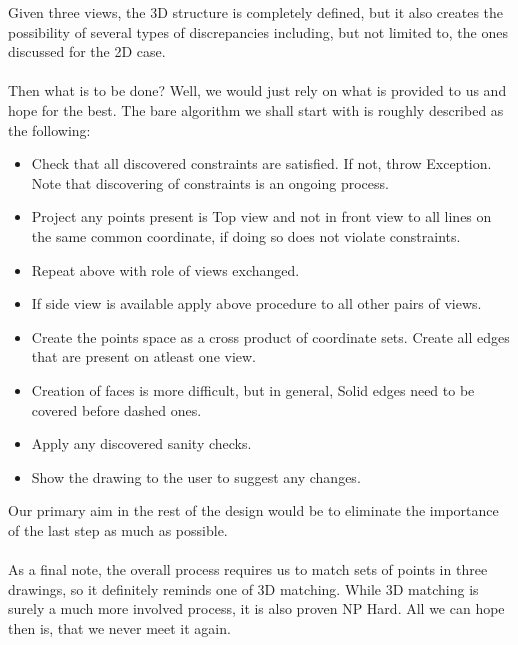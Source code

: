 \documentclass[
11pt, %
english, %
singlespacing, %
headsepline, %
]{MastersDoctoralThesis} %
\begin{document}
Given three views, the 3D structure is completely defined, but it also creates the possibility of several types of discrepancies including, but not limited to, the ones discussed for the 2D case.\\ \\
Then what is to be done? Well, we would just rely on what is provided to us and hope for the best. The bare algorithm we shall start with is roughly described as the following:
\begin{itemize}
\item Check that all discovered constraints are satisfied. If not, throw Exception. Note that discovering of constraints is an ongoing process.
\item Project any points present is Top view and not in front view to all lines on the same common coordinate, if doing so does not violate constraints.
\item Repeat above with role of views exchanged.
\item If side view is available apply above procedure to all other pairs of views.
\item Create the points space as a cross product of coordinate sets. Create all edges that are present on atleast one view.
\item Creation of faces is more difficult, but in general, Solid edges need to be covered before dashed ones. 
\item Apply any discovered sanity checks.
\item Show the drawing to the user to suggest any changes.
\end{itemize}
Our primary aim in the rest of the design would be to eliminate the importance of the last step as much as possible. \\ \\
As a final note, the overall process requires us to match sets of points in three drawings, so it definitely reminds one of 3D matching. While 3D matching is surely a much more involved process, it is also proven NP Hard.  All we can hope then is, that we never meet it again.
\end{document}
